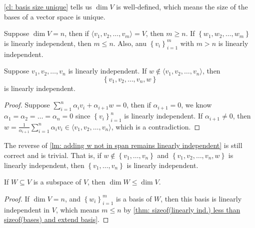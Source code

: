 \begin{remark}
    \autoref{cl: basis size unique} tells us \(\dim V\) is well-defined, which means the size of the bases of a vector space is unique.  
\end{remark}

\begin{corollary}
    Suppose \(\dim V = n\), then if \(\langle v_1, v_2, \dots , v_m \rangle = V \), then \(m \ge n\). If \(\left\{ w_1, w_2, \dots , w_m \right\} \) is linearly independent, then \(m \le n\). Also, anu \(\left\{ v_i \right\}_{i=1}^m \) with \(m > n\) is linearly independent.  
\end{corollary}

\begin{lemma} \label{lm: adding w not in span remains linearly independent}
    Suppose \(v_1, v_2, \dots , v_n\) is linearly independent. If \(w \notin \langle v_1, v_2, \dots , v_n \rangle \), then 
    \[
        \left\{ v_1, v_2, \dots , v_n, w \right\} 
    \] is linearly independent.
\end{lemma}
\begin{proof}
    Suppose \(\sum_{i=1}^n \alpha _i v_i + \alpha _{i+1} w = 0\), then if \(\alpha _{i+1} = 0\), we know \(\alpha _1 = \alpha _2 =\dots = \alpha _n = 0\) since \(\left\{ v_i \right\}_{i=1}^n \) is linearly independent. If \(\alpha _{i+1} \neq 0\), then \(w = \frac{1}{\alpha _{i+1}} \sum_{i=1}^n \alpha _i v_i \in \langle v_1, v_2, \dots , v_n \rangle  \), which is a contradiction.      
\end{proof}

\begin{note}
    The reverse of \autoref{lm: adding w not in span remains linearly independent} is still correct and is trivial. That is, if \(w \notin \left\{ v_1, \dots , v_n \right\} \) and \(\left\{ v_1, v_2, \dots , v_n, w \right\} \) is linearly independent, then \(\left\{ v_1, \dots , v_n \right\} \) is linearly independent.    
\end{note}

\begin{corollary}
    If \(W \subseteq V\) is a subspace of \(V\), then \(\dim W \le \dim V\).   
\end{corollary}
\begin{proof}
    If \(\dim V = n\), and \(\left\{ w_i \right\}_{i=1}^m \) is a basis of \(W\), then this basis is linearly independent in \(V\), which means \(m \le n\) by \autoref{thm: sizeof(linearly ind.) less than sizeof(bases) and extend basis}.       
\end{proof}

